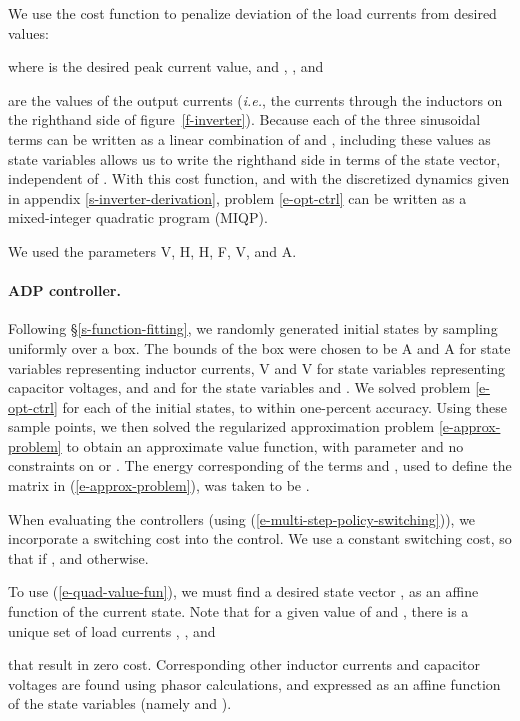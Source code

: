 \documentclass[12pt]{article}
\newcommand{\ie}{{\it i.e.}}
\begin{document}
We use the cost function to 
penalize deviation of the load currents from desired values:

where  is the desired peak current value,
and 
,
,
and

are the values of the output currents
(\ie, the currents through the inductors on the righthand side of figure~\ref{f-inverter}).
Because each of the three sinusoidal terms can be written
as a linear combination of  and ,
including these values as state variables
allows us to write the righthand side in terms of the state vector,
independent of .
With this cost function, 
and with the discretized dynamics given in appendix \ref{s-inverter-derivation},
problem \eqref{e-opt-ctrl}  can be written as a mixed-integer quadratic program (MIQP).


We used the parameters  V,
 H,
 H,
 F,
 V,
and
 A.



\paragraph{ADP controller.}
Following \S\ref{s-function-fitting},
we randomly generated  initial states
by sampling uniformly over a box.
The bounds of the box were chosen to be 
 A and  A for state variables representing inductor currents,
 V and  V for state variables representing capacitor voltages,
and  and  for the state variables  and .
We solved problem \eqref{e-opt-ctrl} for each of the initial states,
to within one-percent accuracy.
Using these sample points,
we then solved the regularized approximation problem 
\eqref{e-approx-problem}
to obtain an approximate value function,
with parameter  and no constraints on  or .
The energy corresponding of the terms 
 and ,
used to define the matrix  in (\ref{e-approx-problem}),
was taken to be .

When evaluating the controllers 
(using (\ref{e-multi-step-policy-switching})),
we incorporate a switching cost into the control.
We use a constant switching cost,
so that  if ,
and  otherwise.

To use (\ref{e-quad-value-fun}),
we must find a desired state vector ,
as an affine function of the current state.
Note that for a given value of  and ,
there is a unique set of load currents 
,
,
and

that result in zero cost.
Corresponding other inductor currents and capacitor voltages
are found using phasor calculations,
and expressed as an affine function of the state variables
(namely  and ).
\end{document}
